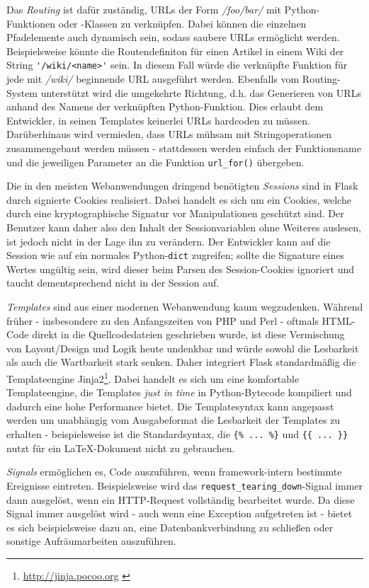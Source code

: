 Das \emph{Routing} ist dafür zuständig, URLs der Form \emph{/foo/bar/} mit Python-Funktionen oder
-Klassen zu verknüpfen. Dabei können die einzelnen Pfadelemente auch dynamisch sein, sodass saubere
URLs ermöglicht werden. Beispielsweise könnte die Routendefiniton für einen Artikel in einem
Wiki der String \lstinline{'/wiki/<name>'} sein. In diesem Fall würde die verknüpfte Funktion für
jede mit \emph{/wiki/} beginnende URL ausgeführt werden. Ebenfalls vom Routing-System unterstützt
wird die umgekehrte Richtung, d.h. das Generieren von URLs anhand des Namens der verknüpften
Python-Funktion. Dies erlaubt dem Entwickler, in seinen Templates keinerlei URLs hardcoden zu
müssen. Darüberhinaus wird vermieden, dass URLs mühsam mit Stringoperationen zusammengebaut werden
müssen - stattdessen werden einfach der Funktionsname und die jeweiligen Parameter an die Funktion
\lstinline{url_for()} übergeben.

Die in den meisten Webanwendungen dringend benötigten \emph{Sessions} sind in Flask durch signierte
Cookies realisiert. Dabei handelt es sich um ein Cookies, welche durch eine kryptographische
Signatur vor Manipulationen geschützt sind. Der Benutzer kann daher also den Inhalt der
Sessionvariablen ohne Weiteres auslesen, ist jedoch nicht in der Lage ihn zu verändern. Der
Entwickler kann auf die Session wie auf ein normales Python-\lstinline{dict} zugreifen; sollte die
Signature eines Wertes ungültig sein, wird dieser beim Parsen des Session-Cookies ignoriert und
taucht dementsprechend nicht in der Session auf.

\emph{Templates} sind aus einer modernen Webanwendung kaum wegzudenken. Während früher -
insbesondere zu den Anfangszeiten von PHP und Perl - oftmals HTML-Code direkt in die
Quellcodedateien geschrieben wurde, ist diese Vermischung von Layout/Design und Logik heute
undenkbar und würde sowohl die Lesbarkeit als auch die Wartbarkeit stark senken. Daher integriert
Flask standardmäßig die Templateengine
Jinja2\footnote{\href{http://jinja.pocoo.org}{http://jinja.pocoo.org} \citep{jinja}}. Dabei handelt es sich um
eine komfortable Templateengine, die Templates \emph{just in time} in Python-Bytecode kompiliert und
dadurch eine hohe Performance bietet. Die Templatesyntax kann angepasst werden um unabhängig vom
Ausgabeformat die Lesbarkeit der Templates zu erhalten - beispielsweise ist die Standardsyntax, die
\lstinline|{% ... %}| und \lstinline|{{ ... }}| nutzt für ein \LaTeX-Dokument nicht zu
gebrauchen.

\emph{Signals} ermöglichen es, Code auszuführen, wenn framework-intern bestimmte Ereignisse
eintreten. Beispielsweise wird das \lstinline{request_tearing_down}-Signal immer dann ausgelöst,
wenn ein HTTP-Request vollständig bearbeitet wurde. Da diese Signal immer ausgelöst wird - auch wenn
eine Exception aufgetreten ist - bietet es sich beispielsweise dazu an, eine Datenbankverbindung zu
schließen oder sonstige Aufräumarbeiten auszuführen.

